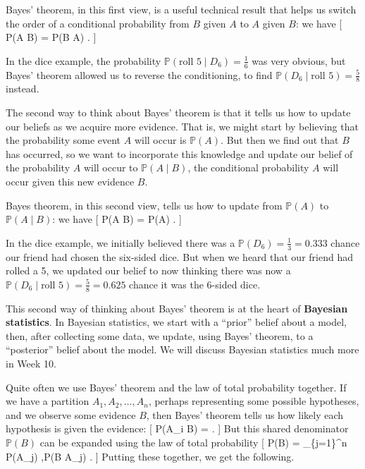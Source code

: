 \documentclass[
  letterpaper,
  DIV=11,
  numbers=noendperiod]{scrreprt}
\theoremstyle{remark}
\begin{document}
Bayes' theorem, in this first view, is a useful technical result that
helps us switch the order of a conditional probability from \(B\) given
\(A\) to \(A\) given \(B\): we have {[} \mathbb P(A \mid B) =
 \times \mathbb P(B \mid A) . {]}

In the dice example, the probability
\(\mathbb P(\text{roll 5} \mid D_6) = \frac16\) was very obvious, but
Bayes' theorem allowed us to reverse the conditioning, to find
\(\mathbb P(D_6 \mid \text{roll 5}) = \frac58\) instead.

The second way to think about Bayes' theorem is that it tells us how to
update our beliefs as we acquire more evidence. That is, we might start
by believing that the probability some event \(A\) will occur is
\(\mathbb P(A)\). But then we find out that \(B\) has occurred, so we
want to incorporate this knowledge and update our belief of the
probability \(A\) will occur to \(\mathbb P(A \mid B)\), the conditional
probability \(A\) will occur given this new evidence \(B\).

Bayes theorem, in this second view, tells us how to update from
\(\mathbb P(A)\) to \(\mathbb P(A \mid B)\): we have {[} \mathbb P(A
\mid B) = \mathbb P(A) \times {} .
{]}

In the dice example, we initially believed there was a
\(\mathbb P(D_6) = \frac13 = 0.333\) chance our friend had chosen the
six-sided dice. But when we heard that our friend had rolled a 5, we
updated our belief to now thinking there was now a
\(\mathbb P(D_6 \mid \text{roll 5}) =\frac58 = 0.625\) chance it was the
6-sided dice.

This second way of thinking about Bayes' theorem is at the heart of
\textbf{Bayesian statistics}. In Bayesian statistics, we start with a
``prior'' belief about a model, then, after collecting some data, we
update, using Bayes' theorem, to a ``posterior'' belief about the model.
We will discuss Bayesian statistics much more in Week 10.

Quite often we use Bayes' theorem and the law of total probability
together. If we have a partition \(A_1, A_2, \dots, A_n\), perhaps
representing some possible hypotheses, and we observe some evidence
\(B\), then Bayes' theorem tells us how likely each hypothesis is given
the evidence: {[} \mathbb P(A\_i \mid B) =
 . {]} But
this shared denominator \(\mathbb P(B)\) can be expanded using the law
of total probability {[} \mathbb P(B) = \sum\_\{j=1\}\^{}n
\mathbb P(A\_j) ,\mathbb P(B \mid A\_j) . {]} Putting these together, we
get the following.
\end{document}
